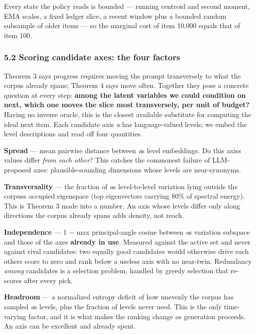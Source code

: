 \documentclass[
  10pt,
]{article}
\theoremstyle{plain}
\theoremstyle{definition}
\begin{document}
Every state the policy reads is bounded --- running centroid and second
moment, EMA scales, a fixed ledger slice, a recent window plus a bounded
random subsample of older items --- so the marginal cost of item 10,000
equals that of item 100.

\subsubsection{5.2 Scoring candidate axes: the four
factors}\label{52-scoring-candidate-axes-the-four-factors}

Theorem 3 says progress requires moving the prompt transversely to what
the corpus already spans; Theorem 4 says move often. Together they pose
a concrete question at every step: \textbf{among the latent variables we
could condition on next, which one moves the slice most transversely,
per unit of budget?} Having no inverse oracle, this is the closest
available substitute for computing the ideal next item. Each candidate
axis \emph{a} has language-valued levels; we embed the level
descriptions and read off four quantities.

\textbf{Spread} --- mean pairwise distance between
\emph{a}\textquotesingle s level embeddings. Do this
axis\textquotesingle s values differ \emph{from each other}? This
catches the commonest failure of LLM-proposed axes: plausible-sounding
dimensions whose levels are near-synonyms.

\textbf{Transversality} --- the fraction of \emph{a}\textquotesingle s
level-to-level variation lying outside the corpus\textquotesingle s
occupied eigenspace (top eigenvectors carrying 80\% of spectral energy).
This is Theorem 3 made into a number. An axis whose levels differ only
along directions the corpus already spans adds density, not reach.

\textbf{Independence} --- 1 − max principal-angle cosine between
\emph{a}\textquotesingle s variation subspace and those of the axes
\textbf{already in use}. Measured against the active set and never
against rival candidates: two equally good candidates would otherwise
drive each other\textquotesingle s score to zero and rank below a
useless axis with no near-twin. Redundancy \emph{among} candidates is a
selection problem, handled by greedy selection that re-scores after
every pick.

\textbf{Headroom} --- a normalized entropy deficit of how unevenly the
corpus has sampled \emph{a}\textquotesingle s levels, plus the fraction
of levels never used. This is the only time-varying factor, and it is
what makes the ranking change as generation proceeds. An axis can be
excellent and already spent.
\end{document}
